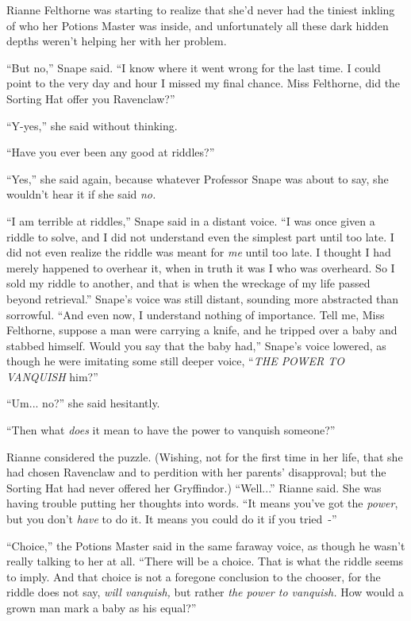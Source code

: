 Rianne Felthorne was starting to realize that she'd never had the tiniest inkling of who her Potions Master was inside, and unfortunately all these dark hidden depths weren't helping her with her problem.

``But no,'' Snape said. ``I know where it went wrong for the last time. I could point to the very day and hour I missed my final chance. Miss Felthorne, did the Sorting Hat offer you Ravenclaw?''

``Y-yes,'' she said without thinking.

``Have you ever been any good at riddles?''

``Yes,'' she said again, because whatever Professor Snape was about to say, she wouldn't hear it if she said \emph{no.}

``I am terrible at riddles,'' Snape said in a distant voice. ``I was once given a riddle to solve, and I did not understand even the simplest part until too late. I did not even realize the riddle was meant for \emph{me} until too late. I thought I had merely happened to overhear it, when in truth it was I who was overheard. So I sold my riddle to another, and that is when the wreckage of my life passed beyond retrieval.'' Snape's voice was still distant, sounding more abstracted than sorrowful. ``And even now, I understand nothing of importance. Tell me, Miss Felthorne, suppose a man were carrying a knife, and he tripped over a baby and stabbed himself. Would you say that the baby had,'' Snape's voice lowered, as though he were imitating some still deeper voice, ``\emph{THE POWER TO VANQUISH} him?''

``Um... no?'' she said hesitantly.

``Then what \emph{does} it mean to have the power to vanquish someone?''

Rianne considered the puzzle. (Wishing, not for the first time in her life, that she had chosen Ravenclaw and to perdition with her parents' disapproval; but the Sorting Hat had never offered her Gryffindor.) ``Well...'' Rianne said. She was having trouble putting her thoughts into words. ``It means you've got the \emph{power}, but you don't \emph{have} to do it. It means you could do it if you tried~-''

``Choice,'' the Potions Master said in the same faraway voice, as though he wasn't really talking to her at all. ``There will be a choice. That is what the riddle seems to imply. And that choice is not a foregone conclusion to the chooser, for the riddle does not say, \emph{will vanquish,} but rather \emph{the power to vanquish.} How would a grown man mark a baby as his equal?''

